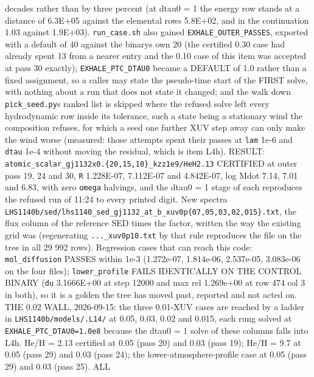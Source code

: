\documentclass[english,a4paper]{my_memo}
\begin{document}
\begin{itemize}
  decades rather than by three percent (at dtau0 = 1 the energy row stands at
  a distance of 6.3E+05 against the elemental row\textquotesingle s 5.8E+02, and in the
  continuation 1.03 against 1.9E+03). \texttt{run\_case.sh} also gained
  \texttt{EXHALE\_OUTER\_PASSES}, exported with a default of 40 against the binary\textquotesingle s
  own 20 (the certified 0.30 case had already spent 13 from a nearer entry
  and the 0.10 case of this item was accepted at pass 30 exactly);
  \texttt{EXHALE\_PTC\_DTAU0} became a DEFAULT of 1.0 rather than a fixed assignment,
  so a caller may state the pseudo-time start of the FIRST solve, with
  nothing about a run that does not state it changed; and the walk down
  \texttt{pick\_seed.py}\textquotesingle s ranked list is skipped where the refused solve left every
  hydrodynamic row inside its tolerance, such a state being a stationary wind
  the composition refuses, for which a seed one further XUV step away can only
  make the wind worse (measured: those attempts spent their passes at \texttt{lam}
  1e-6 and \texttt{dtau} 1e-4 without moving the residual, which is item L4h).
  RESULT: \texttt{atomic\_scalar\_gj1132x0.\{20,15,10\}\_kzz1e9/HeH2.13} CERTIFIED at
  outer pass 19, 24 and 30, \texttt{\textbar{}\textbar{}R\textbar{}\textbar{}} 1.228E-07, 7.112E-07 and 4.842E-07, log
  Mdot 7.14, 7.01 and 6.83, with zero \texttt{omega} halvings, and the dtau0 = 1
  stage of each reproduces the refused run of 11:24 to every printed digit.
  New spectra \texttt{LHS1140b/sed/lhs1140\_sed\_gj1132\_at\_b\_xuv0p\{07,05,03,02,015\}.txt},
  the flux column of the reference SED times the factor, written the way the
  existing grid was (regenerating \texttt{...\_xuv0p10.txt} by that rule reproduces
  the file on the tree in all 29 992 rows). Regression cases that can reach
  this code: \texttt{mol\_diffusion} PASSES within 1e-3 (1.272e-07, 1.814e-06,
  2.537e-05, 3.083e-06 on the four files); \texttt{lower\_profile} FAILS
  IDENTICALLY ON THE CONTROL BINARY (\texttt{du} 3.1666E+00 at step 12000 and
  max rel 1.269e+00 at row 474 col 3 in both), so it is a golden the tree has
  moved past, reported and not acted on.
  THE 0.02 WALL, 2026-09-15: the three 0.01-XUV cases are reached by a
  ladder in \texttt{LHS1140b/models/.L14/} at 0.05, 0.03, 0.02 and 0.015, each rung
  solved at \texttt{EXHALE\_PTC\_DTAU0=1.0e8} because the dtau0 = 1 solve of these
  columns falls into L4h. He/H = 2.13 certified at 0.05 (pass 20) and 0.03
  (pass 19); He/H = 9.7 at 0.05 (pass 29) and 0.03 (pass 24); the
  lower-atmosphere-profile case at 0.05 (pass 29) and 0.03 (pass 25). ALL

\end{itemize}
\end{document}
